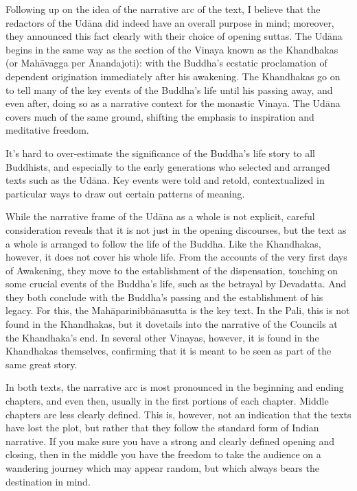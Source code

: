 \documentclass[12pt,openany]{book}%
\begin{document}
Following up on the idea of the narrative arc of the text, I believe that the redactors of the \textsanskrit{Udāna} did indeed have an overall purpose in mind; moreover, they announced this fact clearly with their choice of opening suttas. The \textsanskrit{Udāna} begins in the same way as the section of the Vinaya known as the Khandhakas (or \textsanskrit{Mahāvagga} per Ānandajoti): with the Buddha’s ecstatic proclamation of dependent origination immediately after his awakening. The Khandhakas go on to tell many of the key events of the Buddha’s life until his passing away, and even after, doing so as a narrative context for the monastic Vinaya. The \textsanskrit{Udāna} covers much of the same ground, shifting the emphasis to inspiration and meditative freedom.

It’s hard to over-estimate the significance of the Buddha’s life story to all Buddhists, and especially to the early generations who selected and arranged texts such as the \textsanskrit{Udāna}. Key events were told and retold, contextualized in particular ways to draw out certain patterns of meaning.

While the narrative frame of the \textsanskrit{Udāna} as a whole is not explicit, careful consideration reveals that it is not just in the opening discourses, but the text as a whole is arranged to follow the life of the Buddha. Like the Khandhakas, however, it does not cover his whole life. From the accounts of the very first days of Awakening, they move to the establishment of the dispensation, touching on some crucial events of the Buddha’s life, such as the betrayal by Devadatta. And they both conclude with the Buddha’s passing and the establishment of his legacy. For this, the \textsanskrit{Mahāparinibbānasutta} is the key text. In the Pali, this is not found in the Khandhakas, but it dovetails into the narrative of the Councils at the Khandhaka’s end. In several other Vinayas, however, it is found in the Khandhakas themselves, confirming that it is meant to be seen as part of the same great story.

In both texts, the narrative arc is most pronounced in the beginning and ending chapters, and even then, usually in the first portions of each chapter. Middle chapters are less clearly defined. This is, however, not an indication that the texts have lost the plot, but rather that they follow the standard form of Indian narrative. If you make sure you have a strong and clearly defined opening and closing, then in the middle you have the freedom to take the audience on a wandering journey which may appear random, but which always bears the destination in mind.
\end{document}
